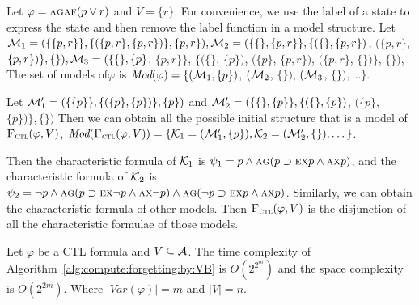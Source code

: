 \documentclass{article}
\begin{document}
\begin{example}
Let $\varphi=\textsc{a}\textsc{g} \textsc{a}\textsc{f} (p \vee r)$ and $V=\{r\}$. For convenience, we use the label of a state to express the state and then remove the label function in a model structure.
Let ${\cal M}_1=(\{\{p,r\}\}, \{(\{p,r\}, \{p,r\})\}, \{p,r\}), {\cal M}_2=(\{\{\},\{p,r\}\}, \{(\{\}, \{p,r\})$, $(\{p,r\}$, $\{p,r\})\}, \{\}), {\cal M}_3=(\{\{\},\{p\}$, $\{p,r\}\}$, $\{(\{\}$, $\{p\})$, $(\{p\}$, $\{p, r\})$, $(\{p, r\}$, $\{\})\}$, $\{\})$,
The set of models of$\varphi$ is $\textit{Mod}(\varphi)=\{({\cal M}_1, \{p\})$, $({\cal M}_2$, $\{\})$, $({\cal M}_3$, $\{\}), \dots\}$.

Let ${\cal M}_1'=(\{\{p\}\}, \{(\{p\}, \{p\})\}, \{p\})$ and ${\cal M}_2'=(\{\{\},\{p\}\}, \{(\{\}, \{p\})$, $(\{p\}$, $\{p\})\}, \{\})$
  Then we can obtain all the possible initial structure that is a model of ${\textsc{F}_{\textsc{ctl}}}(\varphi, V)$, \ie $\textit{Mod}({\textsc{F}_{\textsc{ctl}}}(\varphi, V)) =\{{\cal K}_1=({\cal M}_1', \{p\}), {\cal K}_2=({\cal M}_2', \{\}), \dots\}$.

 Then the characteristic formula of ${\cal K}_1$ is
 $\psi_1= p \wedge \textsc{a}\textsc{g} (p\supset \textsc{e} \textsc{x} p \wedge \textsc{a} \textsc{x} p)$,
 and the characteristic formula of ${\cal K}_2$ is
 $\psi_2=\neg p\wedge \textsc{a}\textsc{g} (p\supset \textsc{e} \textsc{x} \neg p \wedge \textsc{a} \textsc{x} \neg p) \wedge \textsc{a}\textsc{g} (\neg p\supset \textsc{e} \textsc{x} p \wedge \textsc{a} \textsc{x} p)$. Similarly, we can obtain the characteristic formula of other models. Then ${\textsc{F}_{\textsc{ctl}}}(\varphi, V)$ is the disjunction of all the characteristic formulae of those models.
\end{example}

\begin{proposition}
 Let $\varphi$ be a CTL formula and $V\subseteq {\cal A}$. The time complexity of
Algorithm~\ref{alg:compute:forgetting:by:VB} is $O(2^{2^m})$ and the space complexity is $O(2^{2m})$. Where $|Var(\varphi)| = m$ and $|V| = n$.
\end{proposition}
%
\end{document}
